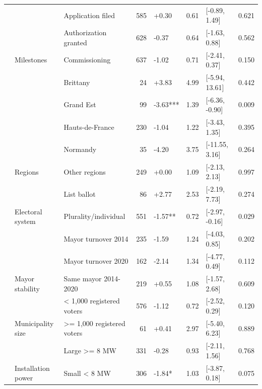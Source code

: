 \begin{ThreePartTable}
\begin{longtable}[t]{lllrllll}
\cmidrule{2-8}\nopagebreak
 &  & Application filed & 585 & +0.30 & 0.61 & {}[-0.89, 1.49] & 0.621\\
\cmidrule{3-8}\nopagebreak
 &  & Authorization granted & 628 & -0.37 & 0.64 & {}[-1.63, 0.88] & 0.562\\
\cmidrule{3-8}\nopagebreak
 & \multirow[t]{-3}{*}{\raggedright\arraybackslash Milestones} & Commissioning & 637 & -1.02 & 0.71 & {}[-2.41, 0.37] & 0.150\\
\cmidrule{2-8}\nopagebreak
 &  & Brittany & 24 & +3.83 & 4.99 & {}[-5.94, 13.61] & 0.442\\
\cmidrule{3-8}\nopagebreak
 &  & Grand Est & 99 & -3.63*** & 1.39 & {}[-6.36, -0.90] & 0.009\\
\cmidrule{3-8}\nopagebreak
 &  & Hauts-de-France & 230 & -1.04 & 1.22 & {}[-3.43, 1.35] & 0.395\\
\cmidrule{3-8}\nopagebreak
 &  & Normandy & 35 & -4.20 & 3.75 & {}[-11.55, 3.16] & 0.264\\
\cmidrule{3-8}\nopagebreak
 & \multirow[t]{-5}{*}{\raggedright\arraybackslash Regions} & Other regions & 249 & +0.00 & 1.09 & {}[-2.13, 2.13] & 0.997\\
\cmidrule{2-8}\nopagebreak
 &  & List ballot & 86 & +2.77 & 2.53 & {}[-2.19, 7.73] & 0.274\\
\cmidrule{3-8}\nopagebreak
 & \multirow[t]{-2}{*}{\raggedright\arraybackslash Electoral system} & Plurality/individual & 551 & -1.57** & 0.72 & {}[-2.97, -0.16] & 0.029\\
\cmidrule{2-8}\nopagebreak
 &  & Mayor turnover 2014 & 235 & -1.59 & 1.24 & {}[-4.03, 0.85] & 0.202\\
\cmidrule{3-8}\nopagebreak
 &  & Mayor turnover 2020 & 162 & -2.14 & 1.34 & {}[-4.77, 0.49] & 0.112\\
\cmidrule{3-8}\nopagebreak
 & \multirow[t]{-3}{*}{\raggedright\arraybackslash Mayor stability} & Same mayor 2014-2020 & 219 & +0.55 & 1.08 & {}[-1.57, 2.68] & 0.609\\
\cmidrule{2-8}\nopagebreak
 &  & < 1,000 registered voters & 576 & -1.12 & 0.72 & {}[-2.52, 0.29] & 0.120\\
\cmidrule{3-8}\nopagebreak
 & \multirow[t]{-2}{*}{\raggedright\arraybackslash Municipality size} & >= 1,000 registered voters & 61 & +0.41 & 2.97 & {}[-5.40, 6.23] & 0.889\\
\cmidrule{2-8}\nopagebreak
 &  & Large >= 8 MW & 331 & -0.28 & 0.93 & {}[-2.11, 1.56] & 0.768\\
\cmidrule{3-8}\nopagebreak
 & \multirow[t]{-2}{*}{\raggedright\arraybackslash Installation power} & Small < 8 MW & 306 & -1.84* & 1.03 & {}[-3.87, 0.18] & 0.075\\

\end{longtable}
\end{ThreePartTable}

